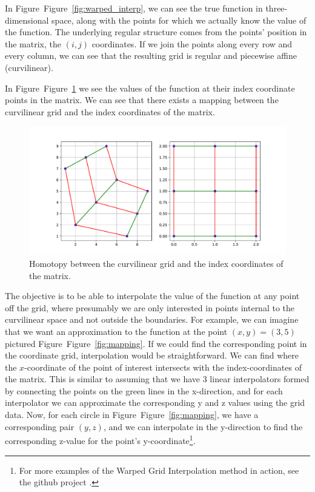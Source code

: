 \documentclass{article}
\begin{document}
In Figure~Figure~\ref{fig:warped_interp}, we can see the true function in three-dimensional space, along with the points for which we actually know the value of the function. The underlying regular structure comes from the points' position in the matrix, the $(i,j)$ coordinates. If we join the points along every row and every column, we can see that the resulting grid is regular and piecewise affine (curvilinear).

In Figure~Figure~\ref{fig:homotopy} we see the values of the function at their index coordinate points in the matrix. We can see that there exists a mapping between the curvilinear grid and the index coordinates of the matrix.

\begin{figure}[!htbp]
\centering
\includegraphics[width=0.7\linewidth]{Figures/Homotopy.pdf}
\caption{Homotopy between the curvilinear grid and the index coordinates of the matrix.}
\label{fig:homotopy}
\end{figure}

The objective is to be able to interpolate the value of the function at any point off the grid, where presumably we are only interested in points internal to the curvilinear space and not outside the boundaries. For example, we can imagine that we want an approximation to the function at the point $(x,y) = (3, 5)$ pictured Figure~Figure~\ref{fig:mapping}. If we could find the corresponding point in the coordinate grid, interpolation would be straightforward. We can find where the $x$-coordinate of the point of interest intersects with the index-coordinates of the matrix. This is similar to assuming that we have 3 linear interpolators formed by connecting the points on the green lines in the x-direction, and for each interpolator we can approximate the corresponding y and z values using the grid data. Now, for each circle in Figure~Figure~\ref{fig:mapping}, we have a corresponding pair $(y,z)$, and we can interpolate in the y-direction to find the corresponding z-value for the point's y-coordinate\footnote{For more examples of the Warped Grid Interpolation method in action, see the github project \href{https://github.com/alanlujan91/multinterp/blob/main/notebooks/CurvilinearInterpolation.ipynb}{\texttt{}}.}.
\end{document}
